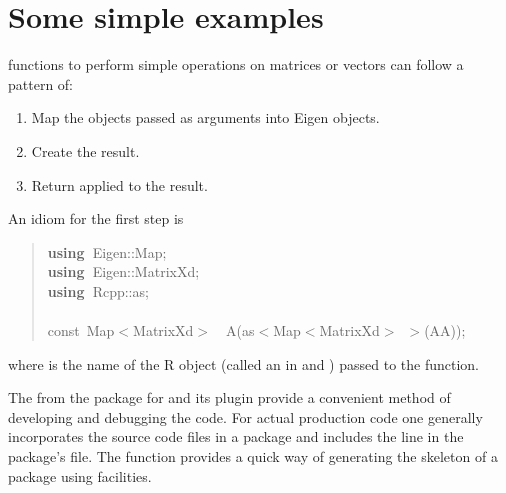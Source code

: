 \documentclass[shortnames,article]{jss}
\newcommand{\hlstd}[1]{\textcolor[rgb]{0,0,0}{#1}}
\newcommand{\hlsym}[1]{\textcolor[rgb]{0,0,0}{#1}}
\newcommand{\hlkwa}[1]{\textcolor[rgb]{0.61,0.13,0.93}{\bf{#1}}}
\newcommand{\hlkwb}[1]{\textcolor[rgb]{0.13,0.54,0.13}{#1}}
\newcommand{\hlkwd}[1]{\textcolor[rgb]{0,0,0}{#1}}
\begin{document}
\pagebreak
\section{Some simple examples}
\label{sec:simple}

 functions to perform simple operations on matrices or
vectors can follow a pattern of:
\begin{enumerate}
\item Map the  objects passed as arguments into Eigen objects.
\item Create the result.
\item Return  applied to the result.
\end{enumerate}

An idiom for the first step is

\begin{quote}
  \noindent
  \ttfamily
  \hlstd{}\hlkwa{using\ }\hlstd{Eigen}\hlsym{::}\hlstd{Map}\hlsym{;}\hspace*{\fill}\\
  \hlstd{}\hlkwa{using\ }\hlstd{Eigen}\hlsym{::}\hlstd{MatrixXd}\hlsym{;}\hspace*{\fill}\\
  \hlstd{}\hlkwa{using\ }\hlstd{Rcpp}\hlsym{::}\hlstd{as}\hlsym{;}\hspace*{\fill}\\
  \hlstd{}\hspace*{\fill}\\
  \hlkwb{const\ }\hlstd{Map}\hlsym{$<$}\hlstd{MatrixXd}\hlsym{$>$}\hlstd{\ \ }\hlsym{}\hlstd{}\hlkwd{A}\hlstd{}\hlsym{(}\hlstd{as}\hlsym{$<$}\hlstd{Map}\hlsym{$<$}\hlstd{MatrixXd}\hlsym{$>$\ $>$(}\hlstd{AA}\hlsym{));}\hlstd{}\hspace*{\fill}\\
  \mbox{}
  \normalfont
\end{quote}
where  is the name of the R object (called an  in
 and ) passed to the  function.

The  from the  package \citep*{CRAN:inline} for
 and its  plugin provide a convenient method of
developing and debugging the  code.  For actual production code
one generally incorporates the  source code files in a package
and includes the line  in the package's
 file.  The  function
provides a quick way of generating the skeleton of a package using
 facilities.
\end{document}

